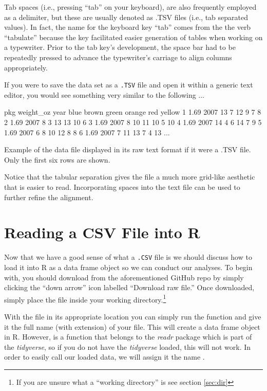 Tab spaces (i.e., pressing ``tab'' on your keyboard), are also frequently employed as a delimiter, but these are usually denoted as .TSV files (i.e., tab separated values). In fact, the name for the keyboard key ``tab'' comes from the the verb ``tabulate'' because the key facilitated easier generation of tables when working on a typewriter. Prior to the tab key's development, the space bar had to be repeatedly pressed to advance the typewriter's carriage to align columns appropriately. 

If you were to save the  data set as a \texttt{.TSV} file and open it within a generic text editor, you would see something very similar to the following ...

\vspace{1em}
\begin{listing}[H]
\begin{raw}
pkg	weight_oz	year	blue	brown	green	orange	red	yellow
1	1.69	2007	13	7	12	9	7	8
2	1.69	2007	8	3	13	13	10	6
3	1.69	2007	8	10	11	10	5	10
4	1.69	2007	14	4	6	14	7	9
5	1.69	2007	6	8	10	12	8	8
6	1.69	2007	7	11	13	7	4	13
...
\end{raw}
\caption*{Example of the  data file displayed in its raw text format if it were a .TSV file. Only the first six rows are shown.}
\end{listing}
\vspace{1em}

Notice that the tabular separation gives the file a much more grid-like aesthetic that is easier to read. Incorporating spaces into the text file can be used to further refine the alignment.

\section{Reading a CSV File into R}

Now that we have a good sense of what a \texttt{.CSV} file is we should discuss how to load it into R as a data frame object so we can conduct our analyses. To begin with, you should download  from the aforementioned GitHub repo by simply clicking the ``down arrow'' icon labelled ``Download raw file.'' Once downloaded, simply place the file inside your working directory.\footnote{If you are unsure what a ``working directory'' is see section \ref{sec:dir}}

With the file in its appropriate location you can simply run the function  and give it the full name (with extension) of your file. This will create a data frame object in R. However,  is a function that belongs to the \textit{readr} package which is part of the \textit{tidyverse}, so if you do not have the \textit{tidyverse} loaded, this will not work. In order to easily call our loaded data, we will assign it the name .

